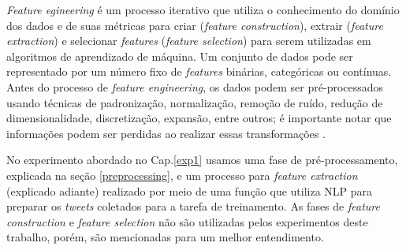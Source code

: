 \documentclass[
	12pt,				%
	oneside,			%
	a4paper,			%
	english,			%
	brazil				%
	]{abntex2ppgsi}
\begin{document}



\textit{Feature egineering} é um processo iterativo que utiliza o conhecimento do domínio dos dados e de suas métricas para criar (\textit{feature construction}), extrair (\textit{feature extraction}) e selecionar \textit{features} (\textit{feature selection}) para serem utilizadas em algoritmos de aprendizado de máquina. Um conjunto de dados pode ser representado por um número fixo de \textit{features} binárias, categóricas ou contínuas. Antes do processo de \textit{feature engineering}, os dados podem ser pré-processados %
usando técnicas de padronização, normalização, remoção de ruído, redução de dimensionalidade, discretização, expansão, entre outros; é importante notar que informações podem ser perdidas ao realizar essas transformações \cite{guyon2006introduction}.

No experimento abordado no Cap.\ref{exp1} usamos uma fase de pré-processamento, explicada na seção \ref{preprocessing}, e um processo para \textit{feature extraction} (explicado adiante) realizado por meio de uma função que utiliza NLP para preparar os \textit{tweets} coletados para a tarefa de treinamento. As fases de \textit{feature construction} e \textit{feature selection} não são utilizadas pelos experimentos deste trabalho, porém, são mencionadas para um melhor entendimento.
\end{document}
